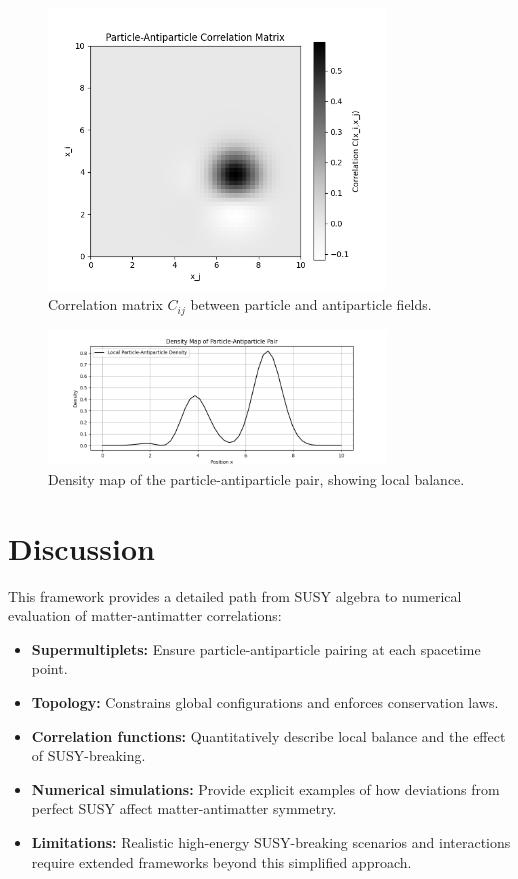 \documentclass[12pt,a4paper]{article}
\begin{document}
\begin{figure}[H]
\centering
\includegraphics[width=0.8\textwidth]{correlation_matrix.png} %
\caption{Correlation matrix \(C_{ij}\) between particle and antiparticle fields.}
\label{fig:correlation}
\end{figure}

\begin{figure}[H]
\centering
\includegraphics[width=0.8\textwidth]{density_map.png} %
\caption{Density map of the particle-antiparticle pair, showing local balance.}
\label{fig:density}
\end{figure}

\section{Discussion}
This framework provides a detailed path from SUSY algebra to numerical evaluation of matter-antimatter correlations:

\begin{itemize}
    \item \textbf{Supermultiplets:} Ensure particle-antiparticle pairing at each spacetime point.  
    \item \textbf{Topology:} Constrains global configurations and enforces conservation laws.  
    \item \textbf{Correlation functions:} Quantitatively describe local balance and the effect of SUSY-breaking.  
    \item \textbf{Numerical simulations:} Provide explicit examples of how deviations from perfect SUSY affect matter-antimatter symmetry.  
    \item \textbf{Limitations:} Realistic high-energy SUSY-breaking scenarios and interactions require extended frameworks beyond this simplified approach.
\end{itemize}
\end{document}
